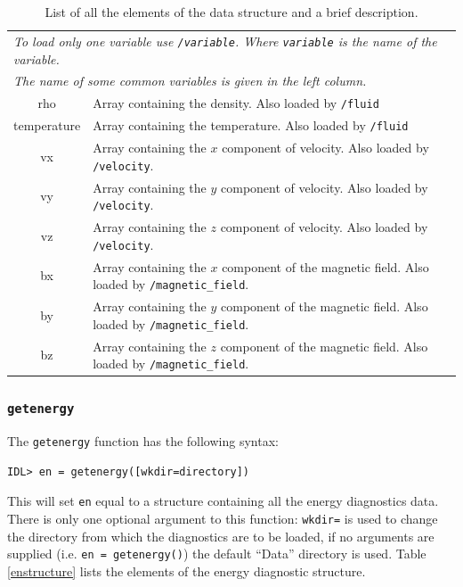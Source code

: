 \documentclass[11pt]{article}
\begin{document}
\begin{table}[!htbp]
\begin{center}
\begin{tabular}{|c|p{}|}
\multicolumn{2}{l}{{\em To load only one variable use \texttt{/variable}. Where \texttt{variable} is the name of the variable.}}\\
\multicolumn{2}{l}{{\em The name of some common variables is given in the left column.}}\\
\hline
rho& Array containing the density. Also loaded by \texttt{/fluid}\\
temperature& Array containing the temperature. Also loaded by \texttt{/fluid}\\
vx& Array containing the $x$ component of velocity. Also loaded by \texttt{/velocity}.\\
vy&Array containing the $y$ component of velocity. Also loaded by \texttt{/velocity}.\\
vz&Array containing the $z$ component of velocity. Also loaded by \texttt{/velocity}.\\
bx&Array containing the $x$ component of the magnetic field. Also loaded by \texttt{/magnetic\_field}.\\
by&Array containing the $y$ component of the magnetic field. Also loaded by \texttt{/magnetic\_field}.\\
bz&Array containing the $z$ component of the magnetic field. Also loaded by \texttt{/magnetic\_field}.\\
\hline
\end{tabular}
\end{center}
\caption{List of all the elements of the data structure and a brief description.}
\label{datastructure}
\end{table} 

\subsubsection{\texttt{getenergy}}
The \texttt{getenergy} function has the following syntax:
\begin{verbatim}
IDL> en = getenergy([wkdir=directory])
\end{verbatim}
This will set \texttt{en} equal to a structure containing all the energy diagnostics data. There is only one optional argument to this function: \texttt{wkdir=} is used to change the directory from which the diagnostics are to be loaded, if no arguments are supplied (i.e. \texttt{en = getenergy()}) the default ``Data'' directory is used. Table \ref{enstructure} lists the elements of the energy diagnostic structure.
\end{document}
